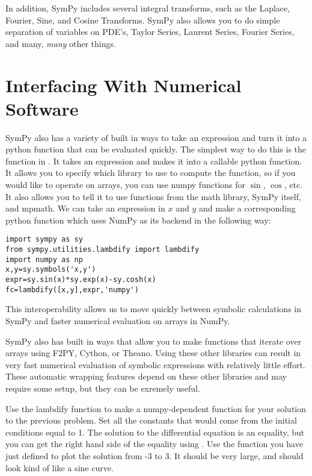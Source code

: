 In addition, SymPy includes several integral transforms, such as the Laplace, Fourier, Sine, and Cosine Transforms.
SymPy also allows you to do simple separation of variables on PDE's, Taylor Series, Laurent Series, Fourier Series, and many, \textit{many} other things.

\section*{Interfacing With Numerical Software}
SymPy also has a variety of built in ways to take an expression and turn it into a python function that can be evaluated quickly.
The simplest way to do this is the  function in .
It takes an expression and makes it into a callable python function. 
It allows you to specify which library to use to compute the function, so if you would like to operate on arrays, you can use numpy functions for $\sin$, $\cos$, etc.
It also allows you to tell it to use functions from the math library, SymPy itself, and mpmath.
We can take an expression in $x$ and $y$ and make a corresponding python function  which uses NumPy as its backend in the following way:
\begin{lstlisting}
import sympy as sy
from sympy.utilities.lambdify import lambdify
import numpy as np
x,y=sy.symbols('x,y')
expr=sy.sin(x)*sy.exp(x)-sy.cosh(x)
fc=lambdify([x,y],expr,'numpy')
\end{lstlisting}
This interoperability allows us to move quickly between symbolic calculations in SymPy and faster numerical evaluation on arrays in NumPy.

SymPy also has built in ways that allow you to make functions that iterate over arrays using F2PY, Cython, or Theano.
Using these other libraries can result in very fast numerical evaluation of symbolic expressions with relatively little effort.
These automatic wrapping features depend on these other libraries and may require some setup, but they can be exremely useful.

\begin{problem}
Use the lambdify function to make a numpy-dependent function for your solution to the previous problem. Set all the constants that would come from the initial conditions equal to 1.
The solution to the differential equation is an equality, but you can get the right hand side of the equality using .
Use the function you have just defined to plot the solution from -3 to 3. 
It should be very large, and should look kind of like a sine curve.
\end{problem}

